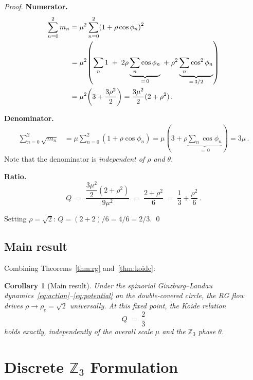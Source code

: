 \documentclass[12pt,a4paper]{article}
\newtheorem{corollary}[theorem]{Corollary}
\theoremstyle{definition}
\newcommand{\rhoc}{\rho_{\mathrm{c}}}
\begin{document}
\begin{proof}
\textbf{Numerator.}
\begin{align}
  \sum_{n=0}^2 m_n
  &= \mu^2\sum_{n=0}^2\!\left(1+\rho\cos\phi_n\right)^2 \notag\\
  &= \mu^2\!\left(\sum_n 1 \;+\; 2\rho\underbrace{\sum_n\cos\phi_n}_{=\,0}
    \;+\; \rho^2\underbrace{\sum_n\cos^2\phi_n}_{=\,3/2}\right) \notag\\
  &= \mu^2\!\left(3 + \frac{3\rho^2}{2}\right)
   = \frac{3\mu^2}{2}(2 + \rho^2)\,. \label{eq:sum_m}
\end{align}

\textbf{Denominator.}
\begin{align}
  \sum_{n=0}^2\sqrt{m_n}
  &= \mu\sum_{n=0}^2\!\left(1+\rho\cos\phi_n\right)
   = \mu\!\left(3 + \rho\underbrace{\sum_n\cos\phi_n}_{=\,0}\right)
   = 3\mu\,. \label{eq:sum_sqrtm}
\end{align}
Note that the denominator is \emph{independent of $\rho$ and $\theta$}.

\textbf{Ratio.}
\begin{equation}
  Q \;=\; \frac{\dfrac{3\mu^2}{2}(2+\rho^2)}{9\mu^2}
       \;=\; \frac{2+\rho^2}{6}
       \;=\; \frac{1}{3} + \frac{\rho^2}{6}\,. \label{eq:Q_exact}
\end{equation}

Setting $\rho = \sqrt{2}$: $Q = (2+2)/6 = 4/6 = 2/3$. \qed
\end{proof}

\subsection{Main result}

Combining Theorems~\ref{thm:rg} and~\ref{thm:koide}:

\begin{corollary}[Main result]
\label{cor:main}
Under the spinorial Ginzburg--Landau dynamics~\eqref{eq:action}--\eqref{eq:potential}
on the double-covered circle, the RG flow drives $\rho \to \rhoc = \sqrt{2}$ universally.
At this fixed point, the Koide relation
\begin{equation}
  Q \;=\; \frac{2}{3}
\end{equation}
holds exactly, independently of the overall scale $\mu$ and the $\mathbb{Z}_3$
phase $\theta$.
\end{corollary}

\section{Discrete \texorpdfstring{$\mathbb{Z}_3$}{Z3} Formulation}
\label{sec:discrete}
\end{document}
